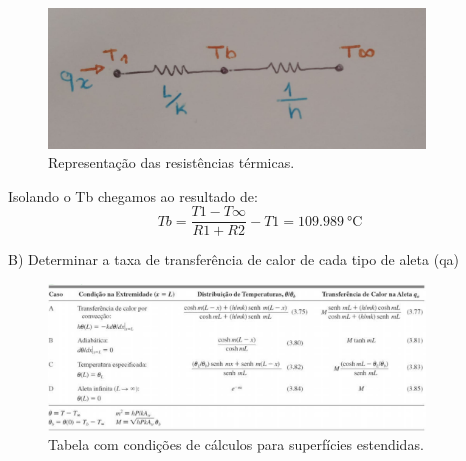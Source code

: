 \vspace{-1cm}
\begin{figure}[h]
    \centering
    \caption{Representação das resistências térmicas.}
    \label{fig:res}
    \includegraphics[width=10cm]{figuras/resistenciasTermicas.jpeg}
    \fonteproprioautor
\end{figure}

Isolando o Tb chegamos ao resultado de:
\begin{equation}
    {Tb}={\frac{T1 -T\infty}{{R1}+{R2}}}-{T1} = \SI{109,989}{\degreeCelsius}
\end{equation}

{\ABNTEXchapterfont\Large{B) Determinar a taxa de transferência de calor de cada tipo de aleta (qa)}}

\begin{figure}[h]
    \centering
    \caption{Tabela com condições de cálculos para superfícies estendidas.}
    \label{fig:tabelaCasosCalc}
    \includegraphics[width=10cm]{figuras/tabelaCasosCalc.jpg}
\end{figure}


